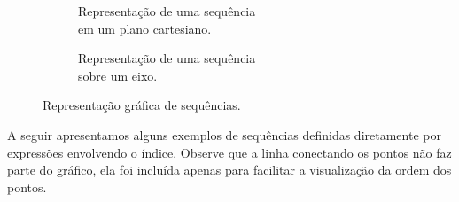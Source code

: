 \begin{figure}
  \centering
  \begin{subfigure}[b]{0.5\linewidth}
    \centering
    
    \caption{Representação de uma sequência\\em um plano cartesiano.}
    \label{fig:grafico-sequencia-cartesiano}
  \end{subfigure}%
  \begin{subfigure}[b]{0.5\linewidth}
    \centering
    
    \caption{Representação de uma sequência\\sobre um eixo.}
    \label{fig:grafico-sequencia-um-eixo}
  \end{subfigure}
  \caption{Representação gráfica de sequências.}
\end{figure}

A seguir apresentamos alguns exemplos de sequências definidas diretamente por
expressões envolvendo o índice.
Observe que a linha conectando os pontos não faz parte do gráfico,
ela foi incluída apenas para facilitar a visualização da ordem dos pontos.

